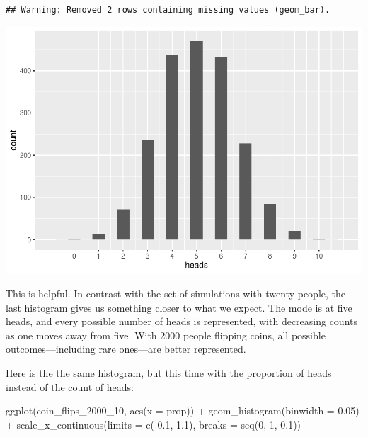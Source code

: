 \documentclass[
]{book}
\newenvironment{Shaded}{\begin{snugshade}}{\end{snugshade}}
\newcommand{\AttributeTok}[1]{\textcolor[rgb]{0.77,0.63,0.00}{#1}}
\newcommand{\DecValTok}[1]{\textcolor[rgb]{0.00,0.00,0.81}{#1}}
\newcommand{\FloatTok}[1]{\textcolor[rgb]{0.00,0.00,0.81}{#1}}
\newcommand{\FunctionTok}[1]{\textcolor[rgb]{0.00,0.00,0.00}{#1}}
\newcommand{\NormalTok}[1]{#1}
\newcommand{\SpecialCharTok}[1]{\textcolor[rgb]{0.00,0.00,0.00}{#1}}
\begin{document}
\begin{verbatim}
## Warning: Removed 2 rows containing missing values (geom_bar).
\end{verbatim}

\includegraphics{intro_stats_files/figure-latex/unnamed-chunk-220-1.pdf}

This is helpful. In contrast with the set of simulations with twenty people, the last histogram gives us something closer to what we expect. The mode is at five heads, and every possible number of heads is represented, with decreasing counts as one moves away from five. With 2000 people flipping coins, all possible outcomes---including rare ones---are better represented.

Here is the the same histogram, but this time with the proportion of heads instead of the count of heads:

\begin{Shaded}
\begin{Highlighting}[]
\FunctionTok{ggplot}\NormalTok{(coin\_flips\_2000\_10, }\FunctionTok{aes}\NormalTok{(}\AttributeTok{x =}\NormalTok{ prop)) }\SpecialCharTok{+}
    \FunctionTok{geom\_histogram}\NormalTok{(}\AttributeTok{binwidth =} \FloatTok{0.05}\NormalTok{) }\SpecialCharTok{+}
    \FunctionTok{scale\_x\_continuous}\NormalTok{(}\AttributeTok{limits =} \FunctionTok{c}\NormalTok{(}\SpecialCharTok{{-}}\FloatTok{0.1}\NormalTok{, }\FloatTok{1.1}\NormalTok{), }\AttributeTok{breaks =} \FunctionTok{seq}\NormalTok{(}\DecValTok{0}\NormalTok{, }\DecValTok{1}\NormalTok{, }\FloatTok{0.1}\NormalTok{))}
\end{Highlighting}
\end{Shaded}
\end{document}
